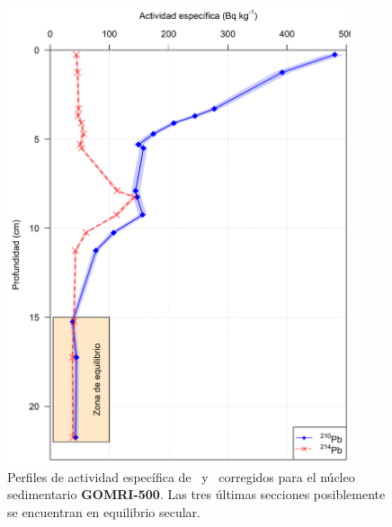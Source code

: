 \begin{figure}
\centering
\includegraphics[width=0.9\textwidth]{Imagenes/Act_210Pb_214Pb_GOMRI_500.png}
\caption{Perfiles de actividad específica de \PbCero\, y \PbCuatro\, corregidos para el núcleo sedimentario \textbf{GOMRI-500}. Las tres últimas secciones posiblemente se encuentran en equilibrio secular.}\label{Fig-GOMRI500-Comp}
\end{figure}
